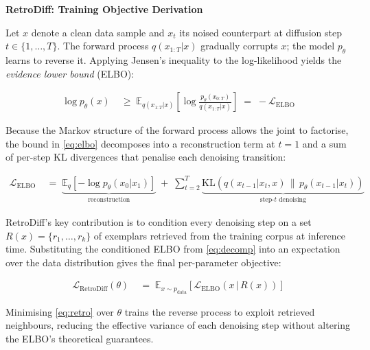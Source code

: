 \documentclass[11pt]{article}
\begin{document}
\begin{center}
  {\large\bfseries RetroDiff: Training Objective Derivation}
\end{center}

\medskip

\noindent
Let $x$ denote a clean data sample and $x_t$ its noised counterpart at diffusion step $t \in \{1,\ldots,T\}$.
The forward process $q(x_{1:T}|x)$ gradually corrupts $x$; the model $p_\theta$ learns to reverse it.
Applying Jensen's inequality to the log-likelihood yields the \emph{evidence lower bound} (ELBO):

\begin{align}
  \log p_\theta(x)
    &\;\geq\;
    \mathbb{E}_{q(x_{1:T}|x)}\!\left[\log\frac{p_\theta(x_{0:T})}{q(x_{1:T}|x)}\right]
    \;=\; -\mathcal{L}_{\mathrm{ELBO}}
  \label{eq:elbo}
\end{align}

\noindent
Because the Markov structure of the forward process allows the joint to factorise,
the bound in \eqref{eq:elbo} decomposes into a reconstruction term at $t{=}1$
and a sum of per-step KL divergences that penalise each denoising transition:

\begin{align}
  \mathcal{L}_{\mathrm{ELBO}}
    &\;=\;
    \underbrace{\mathbb{E}_q[-\log p_\theta(x_0|x_1)]}_{\text{reconstruction}}
    \;+\;
    \sum_{t=2}^{T}
    \underbrace{
      \mathrm{KL}\!\left(q(x_{t-1}|x_t,x)\,\|\,p_\theta(x_{t-1}|x_t)\right)
    }_{\text{step-}t\text{ denoising}}
  \label{eq:decomp}
\end{align}

\noindent
RetroDiff's key contribution is to condition every denoising step on a set
$R(x) = \{r_1,\ldots,r_k\}$ of exemplars retrieved from the training corpus
at inference time.
Substituting the conditioned ELBO from \eqref{eq:decomp} into an expectation
over the data distribution gives the final per-parameter objective:

\begin{align}
  \mathcal{L}_{\mathrm{RetroDiff}}(\theta)
    &\;=\;
    \mathbb{E}_{x\sim p_{\mathrm{data}}}\!\left[
      \mathcal{L}_{\mathrm{ELBO}}\!\left(x\,\big|\,R(x)\right)
    \right]
  \label{eq:retro}
\end{align}

\noindent
Minimising \eqref{eq:retro} over $\theta$ trains the reverse process to exploit
retrieved neighbours, reducing the effective variance of each denoising step
without altering the ELBO's theoretical guarantees.
\end{document}
